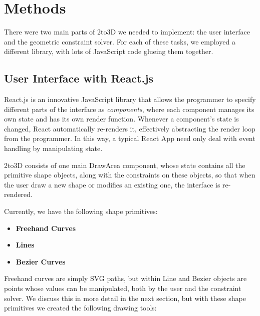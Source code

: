 \section{Methods}

There were two main parts of 2to3D we needed to implement: the user interface and the geometric constraint solver. For each of these tasks, we employed a different library, with lots of JavaScript code glueing them together.

\subsection*{User Interface with React.js}

React.js is an innovative JavaScript library that allows the programmer to specify different parts of the interface as {\it components}, where each component manages its own state and has its own render function. Whenever a component's state is changed, React automatically re-renders it, effectively abstracting the render loop from the programmer. In this way, a typical React App need only deal with event handling by manipulating state.

2to3D consists of one main DrawArea component, whose state contains all the primitive shape objects, along with the constraints on these objects, so that when the user draw a new shape or modifies an existing one, the interface is re-rendered.


Currently, we have the following shape primitives:

\begin{itemize}
\item {\bf Freehand Curves}
\item {\bf Lines}
\item {\bf Bezier Curves}
\end{itemize}

Freehand curves are simply SVG paths, but within Line and Bezier objects are points whose values can be manipulated, both by the user and the constraint solver. We discuss this in more detail in the next section, but with these shape primitives we created the following drawing tools:

